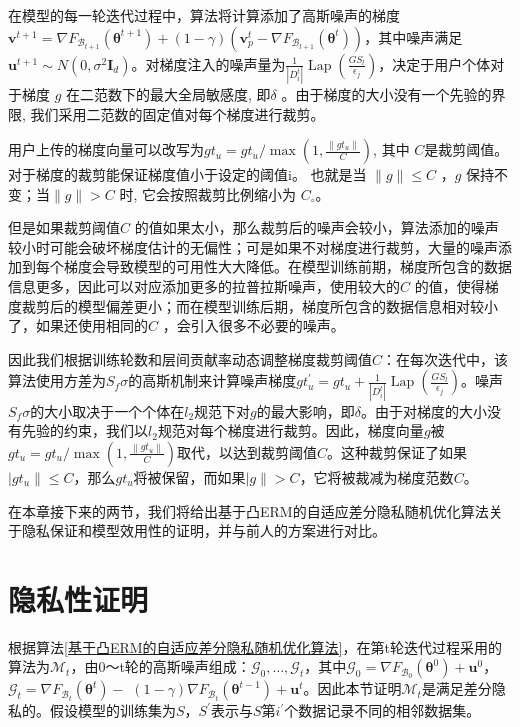 在模型的每一轮迭代过程中，算法将计算添加了高斯噪声的梯度$\mathbf{v}^{t+1}=\nabla F_{\mathcal{B}_{t+1}}\left(\boldsymbol{\theta}^{t+1}\right)+(1-\gamma)\left(\mathbf{v}_{p}^{t}-\nabla F_{\mathcal{B}_{t+1}}\left(\boldsymbol{\theta}^{t}\right)\right)$，其中噪声满足$\mathbf{u}^{t+1} \sim N\left(0, \sigma^{2} \mathbf{I}_{d}\right)$。对梯度注入的噪声量为$\frac{1}{\left|D_{i}^{t}\right|} \operatorname{Lap}\left(\frac{G S_{l}}{\epsilon_{j}}\right)$，决定于用户个体对于梯度 $g$ 在二范数下的最大全局敏感度, 即$\delta$ 。由于梯度的大小没有一个先验的界限, 我们采用二范数的固定值对每个梯度进行裁剪。

用户上传的梯度向量可以改写为$g t_{u}=g t_{u} / \max \left(1, \frac{\left\|g t_{u}\right\|}{C}\right)$, 其中 $C$是裁剪阈值。对于梯度的裁剪能保证梯度值小于设定的阈值$\mathrm{i}$。 也就是当 $\|g\| \leq C$ ，$g$ 保持不变；当$\|g\|>C$ 时, 它会按照裁剪比例缩小为 $C_{\circ}$。

但是如果裁剪阈值$C$ 的值如果太小，那么裁剪后的噪声会较小，算法添加的噪声较小时可能会破坏梯度估计的无偏性；可是如果不对梯度进行裁剪，大量的噪声添加到每个梯度会导致模型的可用性大大降低。在模型训练前期，梯度所包含的数据信息更多，因此可以对应添加更多的拉普拉斯噪声，使用较大的$C$ 的值，使得梯度裁剪后的模型偏差更小；而在模型训练后期，梯度所包含的数据信息相对较小了，如果还使用相同的$C$ ，会引入很多不必要的噪声。

因此我们根据训练轮数和层间贡献率动态调整梯度裁剪阈值$C$：在每次迭代中，该算法使用方差为$S_{f} \sigma$的高斯机制来计算噪声梯度$g t_{u}^{\prime}=g t_{u}+\frac{1}{\left|D_{i}^{t}\right|} \operatorname{Lap}\left(\frac{G S_{l}}{\epsilon_{j}}\right)$。噪声$S_{f} \sigma$的大小取决于一个个体在$l_{2}$规范下对$g$的最大影响，即$\delta$。由于对梯度的大小没有先验的约束，我们以$l_{2}$规范对每个梯度进行裁剪。因此，梯度向量$g$被$g t_{u}=g t_{u} / \max \left(1, \frac{\left\|g t_{u}\right\|}{C}\right)$取代，以达到裁剪阈值$C$。这种裁剪保证了如果$|g t_{u}\| \leq C$，那么$g t_{u}$将被保留，而如果$|g\|>C$，它将被裁减为梯度范数$C$。

在本章接下来的两节，我们将给出基于凸ERM的自适应差分隐私随机优化算法关于隐私保证和模型效用性的证明，并与前人的方案进行对比。

\section{隐私性证明}
根据算法\ref{基于凸ERM的自适应差分隐私随机优化算法}，在第t轮迭代过程采用的算法为$\mathcal{M}_{t}$，由0～t轮的高斯噪声组成：$\mathcal{G}_{0}, \ldots, \mathcal{G}_{t}$，其中$\mathcal{G}_{0}=\nabla F_{\mathcal{B}_{0}}\left(\boldsymbol{\theta}^{0}\right)+\mathbf{u}^{0}$，$\mathcal{G}_{t}=\nabla F_{\mathcal{B}_{t}}\left(\boldsymbol{\theta}^{t}\right)-$ $(1-\gamma) \nabla F_{\mathcal{B}_{t}}\left(\boldsymbol{\theta}^{t-1}\right)+\mathbf{u}^{t}$。因此本节证明$\mathcal{M}_{t}$是满足差分隐私的。假设模型的训练集为$S$，$S^{\prime}$表示与$S$第$i^{\prime}$个数据记录不同的相邻数据集。

